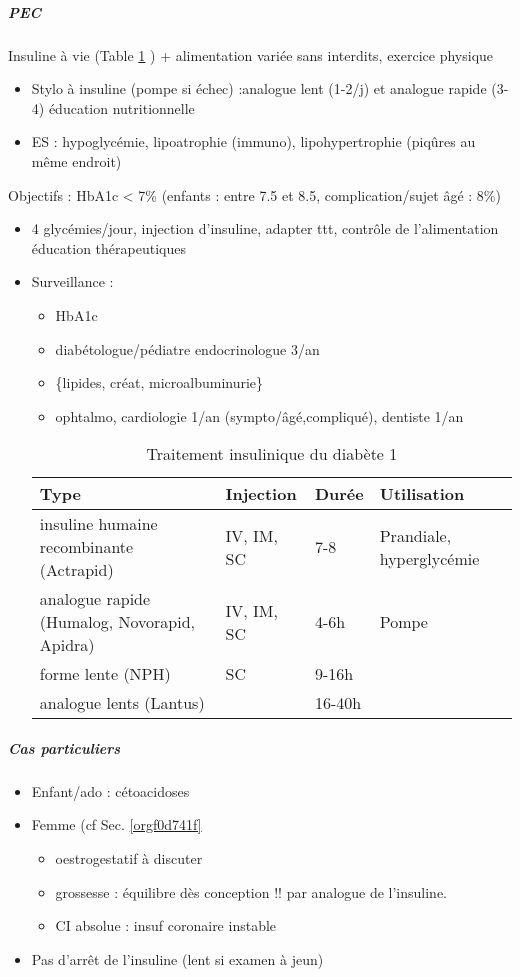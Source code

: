 \documentclass[11pt]{article}
\begin{document}
\subparagraph{PEC}
\label{sec:org7a0c698}
Insuline à vie (Table \ref{tab:org8963bff} ) + alimentation variée sans interdits, exercice physique
\begin{itemize}
\item Stylo à insuline (pompe si échec) :analogue lent (1-2/j) et analogue rapide (3-4) \thus
éducation nutritionnelle
\item ES : hypoglycémie, lipoatrophie (immuno), lipohypertrophie (piqûres au même endroit)
\end{itemize}

Objectifs : HbA1c < 7\% (enfants : entre 7.5 et 8.5, complication/sujet âgé : 8\%)
\begin{itemize}
\item 4 glycémies/jour, injection d'insuline, adapter ttt, contrôle de l'alimentation \thus
éducation thérapeutiques
\item Surveillance :
\begin{itemize}
\item HbA1c
\item diabétologue/pédiatre endocrinologue 3/an
\item \{lipides, créat, microalbuminurie\}
\item ophtalmo, cardiologie 1/an (sympto/âgé,compliqué), dentiste 1/an
\end{itemize}

\begin{table}[htbp]
\caption{\label{tab:org8963bff}Traitement insulinique du diabète 1}
\centering
\begin{tabular}{llll}
Type & Injection & Durée & Utilisation\\
\hline
insuline humaine recombinante (Actrapid) & IV, IM, SC & 7-8 & Prandiale, hyperglycémie\\
analogue rapide (Humalog, Novorapid, Apidra) & IV, IM, SC & 4-6h & Pompe\\
forme lente (NPH) & SC & 9-16h & \\
analogue lents (Lantus) &  & 16-40h & \\
\end{tabular}
\end{table}
\end{itemize}


\subparagraph{Cas particuliers}
\label{sec:org6751fed}
\begin{itemize}
\item Enfant/ado : \danger cétoacidoses
\item Femme (cf Sec. \ref{orgf0d741f}
\begin{itemize}
\item oestrogestatif à discuter
\item grossesse : équilibre dès conception !! par analogue de l'insuline.
\item CI absolue : insuf coronaire instable
\end{itemize}
\item Pas d'arrêt de l'insuline (lent si examen à jeun)
\end{itemize}
\end{document}
